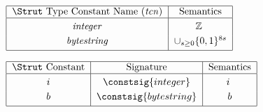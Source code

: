 \documentclass[../plutus-core-specification.tex]{subfiles}
\begin{document}
\vspace{1cm}


\begin{minipage}{\linewidth}
\centering

    \(\begin{tabular}{|c|c|}\hline
    \Strut
        \textrm{Type Constant Name (\textit{tcn})} & \textrm{Semantics}\\
        \hline
        \textit{integer} & $\mathbb{Z}$ \rule{0mm}{4mm}  \\[3pt]
        \textit{bytestring} & $\cup_{s \ge 0}\{0,1\}^{8s}$\\[3pt]
        \hline
   \end{tabular}\)
   \label{fig:type_constants}

\end{minipage}
\vspace{1cm}



\begin{minipage}{\linewidth}
\centering
   \(\begin{tabular}{|c|c|c|}\hline
    \Strut
        \textrm{Constant} & \textrm{Signature} & \textrm{Semantics}\\
        \hline
        $i$   & $\constsig{integer}$  &$i$ \rule{0mm}{4mm} \\[3pt]
        $b$   & $\constsig{bytestring}$ & $b$\\[3pt]
        \hline
    \end{tabular}\)
    \label{fig:constants}
\end{minipage}

\end{document}

